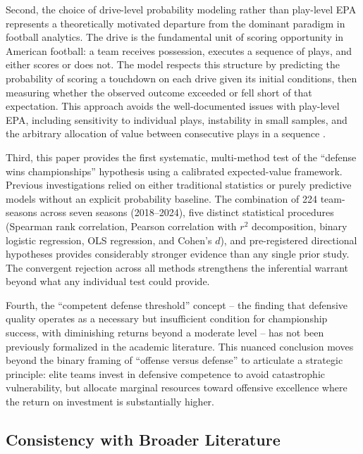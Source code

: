 Second, the choice of drive-level probability modeling rather than play-level
EPA represents a theoretically motivated departure from the dominant paradigm
in football analytics. The drive is the fundamental unit of scoring opportunity
in American football: a team receives possession, executes a sequence of plays,
and either scores or does not. The \xscore{} model respects this structure by
predicting the probability of scoring a touchdown on each drive given its
initial conditions, then measuring whether the observed outcome exceeded or
fell short of that expectation. This approach avoids the well-documented issues
with play-level EPA, including sensitivity to individual plays, instability in
small samples, and the arbitrary allocation of value between consecutive plays
in a sequence \parencite{yurko2019nflwar}.

Third, this paper provides the first systematic, multi-method test of the
``defense wins championships'' hypothesis using a calibrated expected-value
framework. Previous investigations relied on either traditional statistics
\parencite{robst2011defense} or purely predictive models
\parencite{lock2014randomforests} without an explicit probability baseline.
The combination of 224 team-seasons across seven seasons (2018--2024), five
distinct statistical procedures (Spearman rank correlation, Pearson
correlation with $r^2$ decomposition, binary logistic regression, OLS
regression, and Cohen's $d$), and
pre-registered directional hypotheses provides considerably stronger evidence
than any single prior study. The convergent rejection across all methods
strengthens the inferential warrant beyond what any individual test could
provide.

Fourth, the ``competent defense threshold'' concept -- the finding that
defensive quality operates as a necessary but insufficient condition for
championship success, with diminishing returns beyond a moderate level -- has
not been previously formalized in the academic literature. This nuanced
conclusion moves beyond the binary framing of ``offense versus defense'' to
articulate a strategic principle: elite teams invest in defensive competence
to avoid catastrophic vulnerability, but allocate marginal resources toward
offensive excellence where the return on investment is substantially higher.

\subsection{Consistency with Broader Literature}
\label{sec:consistency-literature}

